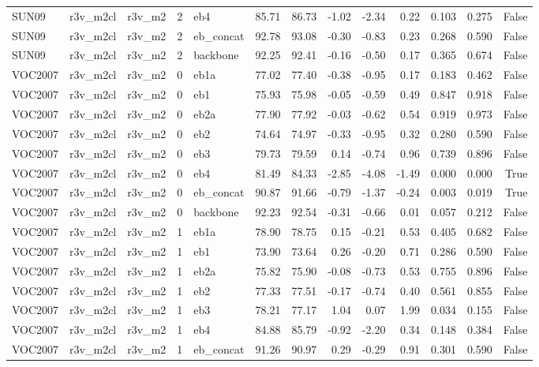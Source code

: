 \begin{table}
\begin{tabular}{lllrlrrrrrllr}
SUN09 & r3v\_m2cl & r3v\_m2 & 2 & eb4 & 85.71 & 86.73 & -1.02 & -2.34 & 0.22 & 0.103 & 0.275 & False \\
SUN09 & r3v\_m2cl & r3v\_m2 & 2 & eb\_concat & 92.78 & 93.08 & -0.30 & -0.83 & 0.23 & 0.268 & 0.590 & False \\
SUN09 & r3v\_m2cl & r3v\_m2 & 2 & backbone & 92.25 & 92.41 & -0.16 & -0.50 & 0.17 & 0.365 & 0.674 & False \\
VOC2007 & r3v\_m2cl & r3v\_m2 & 0 & eb1a & 77.02 & 77.40 & -0.38 & -0.95 & 0.17 & 0.183 & 0.462 & False \\
VOC2007 & r3v\_m2cl & r3v\_m2 & 0 & eb1 & 75.93 & 75.98 & -0.05 & -0.59 & 0.49 & 0.847 & 0.918 & False \\
VOC2007 & r3v\_m2cl & r3v\_m2 & 0 & eb2a & 77.90 & 77.92 & -0.03 & -0.62 & 0.54 & 0.919 & 0.973 & False \\
VOC2007 & r3v\_m2cl & r3v\_m2 & 0 & eb2 & 74.64 & 74.97 & -0.33 & -0.95 & 0.32 & 0.280 & 0.590 & False \\
VOC2007 & r3v\_m2cl & r3v\_m2 & 0 & eb3 & 79.73 & 79.59 & 0.14 & -0.74 & 0.96 & 0.739 & 0.896 & False \\
VOC2007 & r3v\_m2cl & r3v\_m2 & 0 & eb4 & 81.49 & 84.33 & -2.85 & -4.08 & -1.49 & 0.000 & 0.000 & True \\
VOC2007 & r3v\_m2cl & r3v\_m2 & 0 & eb\_concat & 90.87 & 91.66 & -0.79 & -1.37 & -0.24 & 0.003 & 0.019 & True \\
VOC2007 & r3v\_m2cl & r3v\_m2 & 0 & backbone & 92.23 & 92.54 & -0.31 & -0.66 & 0.01 & 0.057 & 0.212 & False \\
VOC2007 & r3v\_m2cl & r3v\_m2 & 1 & eb1a & 78.90 & 78.75 & 0.15 & -0.21 & 0.53 & 0.405 & 0.682 & False \\
VOC2007 & r3v\_m2cl & r3v\_m2 & 1 & eb1 & 73.90 & 73.64 & 0.26 & -0.20 & 0.71 & 0.286 & 0.590 & False \\
VOC2007 & r3v\_m2cl & r3v\_m2 & 1 & eb2a & 75.82 & 75.90 & -0.08 & -0.73 & 0.53 & 0.755 & 0.896 & False \\
VOC2007 & r3v\_m2cl & r3v\_m2 & 1 & eb2 & 77.33 & 77.51 & -0.17 & -0.74 & 0.40 & 0.561 & 0.855 & False \\
VOC2007 & r3v\_m2cl & r3v\_m2 & 1 & eb3 & 78.21 & 77.17 & 1.04 & 0.07 & 1.99 & 0.034 & 0.155 & False \\
VOC2007 & r3v\_m2cl & r3v\_m2 & 1 & eb4 & 84.88 & 85.79 & -0.92 & -2.20 & 0.34 & 0.148 & 0.384 & False \\
VOC2007 & r3v\_m2cl & r3v\_m2 & 1 & eb\_concat & 91.26 & 90.97 & 0.29 & -0.29 & 0.91 & 0.301 & 0.590 & False \\

\end{tabular}
\end{table}
